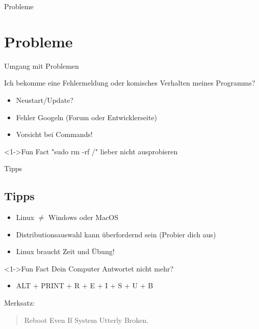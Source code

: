 
\begin{frame}{Probleme}
    \section{Probleme}\label{sec:probleme}

\end{frame}

\begin{frame}{Umgang mit Problemen}

    Ich bekomme eine Fehlermeldung oder komisches Verhalten meines Programms?

    \begin{itemize}
        \item<2-> Neustart/Update?
        \item<3-> Fehler Googeln (Forum oder Entwicklerseite)
        \item<4-> Vorsicht bei Commands!
    \end{itemize}

    \vspace{0.5cm}
    \begin{exampleblock}<1->{Fun Fact}
        "sudo rm -rf /" lieber nicht ausprobieren
    \end{exampleblock}

\end{frame}

\begin{frame}{Tipps}
    \subsection{Tipps}\label{subsec:tipps}

    \begin{itemize}
        \item<1-> {Linux $\neq$ Windows oder MacOS}
        \item<2-> Distributionsauswahl kann überfordernd sein (Probier dich aus)
        \item<3-> Linux braucht Zeit und Übung!
    \end{itemize}

    \vspace{0.5cm}
    \begin{exampleblock}<1->{Fun Fact}
        Dein Computer Antwortet nicht mehr?
        \begin{itemize}
            \item ALT + PRINT + R + E + I + S + U + B
        \end{itemize}
        Merksatz:
        \begin{quote}
            Reboot Even If System Utterly Broken.
        \end{quote}
    \end{exampleblock}

\end{frame}
